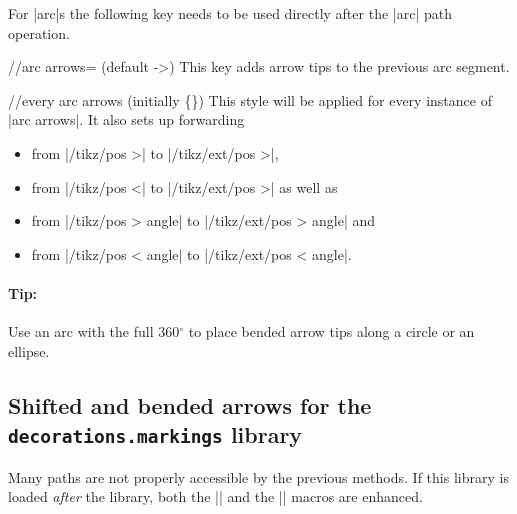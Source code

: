 \begin{multicols}{2}
For |arc|s the following key needs to be used directly after the |arc| path operation.
\begin{key}{/\tikzext/arc arrows= (default ->)}
This key adds arrow tips to the previous arc segment.
\begin{stylekey}{/\tikzext/every arc arrows (initially \{\})}
This style will be applied for every instance of |arc arrows|.
It also sets up forwarding
\begin{itemize}
  \item from |/tikz/pos >| to |/tikz/ext/pos >|,
  \item from |/tikz/pos <| to |/tikz/ext/pos >| as well as
  \item from |/tikz/pos > angle| to |/tikz/ext/pos > angle| and
  \item from |/tikz/pos < angle| to |/tikz/ext/pos < angle|.
\end{itemize}
\begin{codeexample}[preamble=\usetikzlibrary{arrows.meta, ext.arrows-plus}]
\end{codeexample}
\end{stylekey}


\paragraph{Tip:}
Use an arc with the full 360${}^\circ$ to place bended arrow tips along a circle or an ellipse.
\end{key}
\subsection{Shifted and bended arrows for the \texttt{decorations.markings} library}
Many paths are not properly accessible by the previous methods.
If this library is loaded \emph{after}
the  library,
both the |\arrow| and
the |\arrowreversed| macros are enhanced.


\end{multicols}
